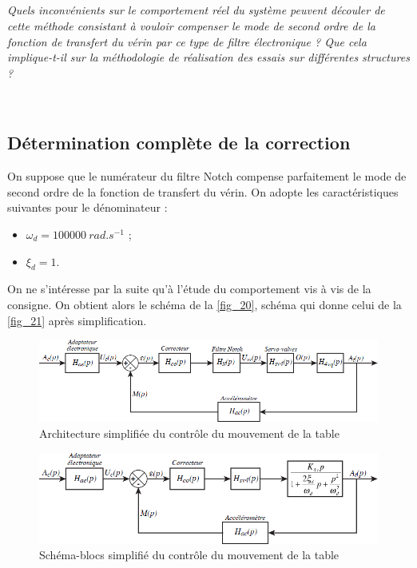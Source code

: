 \documentclass[10pt,fleqn]{article} %
\begin{document}
\subparagraph{\label{q_40}}\textit{Quels inconvénients sur le comportement réel du système peuvent découler de cette méthode
consistant à vouloir compenser le mode de second ordre de la fonction de transfert du vérin
par ce type de filtre électronique ? Que cela implique-t-il sur la méthodologie de réalisation
des essais sur différentes structures ?}
\ifprof
\begin{corrige} ~\\

\end{corrige}
\else
\fi

\subsection{Détermination complète de la correction}
On suppose que le numérateur du filtre Notch compense parfaitement le mode de second ordre de la fonction
de transfert du vérin. On adopte les caractéristiques suivantes pour le dénominateur :
\begin{itemize}
\item $\omega_d = \SI{100 000}{rad.s^{-1}}$ ;
\item $\xi_d = 1$.
\end{itemize}
On ne s’intéresse par la suite qu’à l’étude du comportement vis à vis de la consigne. On obtient alors le
schéma de la \autoref{fig_20}, schéma qui donne celui de la \autoref{fig_21} après simplification.

\begin{figure}[H]
\centering
\includegraphics[width=0.8\linewidth]{fig_20}
\caption{ Architecture simplifiée du contrôle du mouvement de la table \label{fig_20}}
\end{figure}


\begin{figure}[H]
\centering
\includegraphics[width=0.7\linewidth]{fig_21}
\caption{Schéma-blocs simplifié du contrôle du mouvement de la table \label{fig_21}}
\end{figure}
\end{document}
